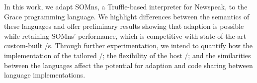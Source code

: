 

%
%
%

% 
%


In this work, we adapt SOMns, a Truffle-based interpreter for Newspeak, to the Grace programming language.
We highlight differences between the semantics of these languages and offer preliminary results showing that adaption is possible while retaining SOMns' performance, which is competitive with state-of-the-art custom-built \vm/s.
Through further experimentation, we intend to quantify how the implementation of the tailored \vm/; the flexibility of the host \vm/; and the similarities between the languages affect the potential for adaption and code sharing between language implementations.

